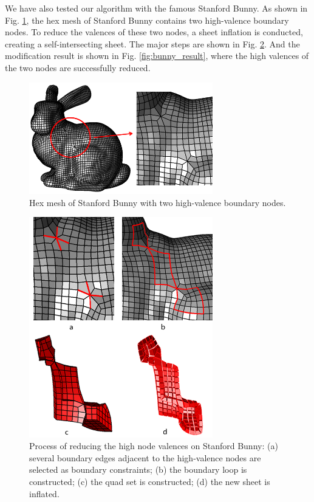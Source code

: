 \documentclass[final,5p,times,twocolumn]{elsarticle}
\begin{document}
We have also tested our algorithm with the famous Stanford Bunny. As shown in Fig. \ref{fig:bunny_input}, the hex mesh of Stanford Bunny contains two high-valence boundary nodes. To reduce the valences of these two nodes, a sheet inflation is conducted, creating a self-intersecting sheet. The major steps are shown in Fig. \ref{fig:bunny_proc}. And the modification result is shown in Fig. \ref{fig:bunny_result}, where  the high valences of the two nodes are successfully reduced.

\begin{figure}[htbp]
\begin{center}
\includegraphics[width=8cm]{bunny_input.png}
\caption{Hex mesh of Stanford Bunny with two high-valence boundary nodes.}
\label{fig:bunny_input}
\end{center}
\end{figure}


\begin{figure}[htbp]
\begin{center}
\includegraphics[width=8cm]{bunny_proc.png}
\caption{Process of reducing the high node valences on Stanford Bunny: (a) several boundary edges adjacent to the high-valence nodes are selected as boundary constraints; (b) the boundary loop is constructed; (c) the quad set is constructed; (d) the new sheet is inflated.}
\label{fig:bunny_proc}
\end{center}
\end{figure}
\end{document}
